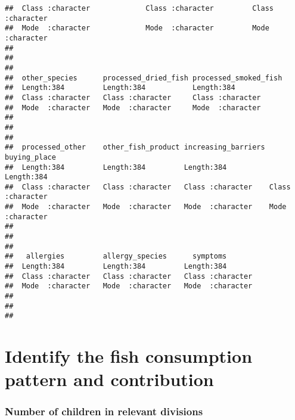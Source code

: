 \documentclass[
]{article}
\begin{document}
\begin{verbatim}
##  Class :character             Class :character         Class :character     
##  Mode  :character             Mode  :character         Mode  :character     
##                                                                             
##                                                                             
##                                                                             
##  other_species      processed_dried_fish processed_smoked_fish
##  Length:384         Length:384           Length:384           
##  Class :character   Class :character     Class :character     
##  Mode  :character   Mode  :character     Mode  :character     
##                                                               
##                                                               
##                                                               
##  processed_other    other_fish_product increasing_barriers buying_place      
##  Length:384         Length:384         Length:384          Length:384        
##  Class :character   Class :character   Class :character    Class :character  
##  Mode  :character   Mode  :character   Mode  :character    Mode  :character  
##                                                                              
##                                                                              
##                                                                              
##   allergies         allergy_species      symptoms        
##  Length:384         Length:384         Length:384        
##  Class :character   Class :character   Class :character  
##  Mode  :character   Mode  :character   Mode  :character  
##                                                          
##                                                          
## 
\end{verbatim}

\hypertarget{identify-the-fish-consumption-pattern-and-contribution}{%
\section{Identify the fish consumption pattern and
contribution}\label{identify-the-fish-consumption-pattern-and-contribution}}

\hypertarget{number-of-children-in-relevant-divisions}{%
\subsubsection{Number of children in relevant
divisions}\label{number-of-children-in-relevant-divisions}}
\end{document}
